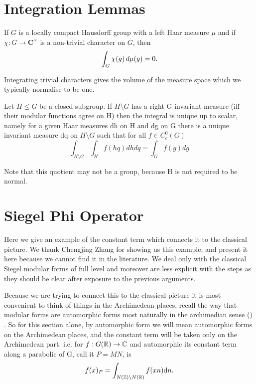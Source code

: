 

\section{Integration Lemmas}
\begin{Theorem}\label{integrate_unitary_char}
	If \(G\) is a locally compact Hausdorff group with a left Haar measure \(\mu\) and if \(\chi\colon G\to \mathbf C^\times\) is a non-trivial character on \(G\), then
	\[ \int^{}_{G}\chi(g)\,d\mu(g) = 0. \]
\end{Theorem}
Integrating trivial characters gives the volume of the measure space which we typically normalise to be one.

\begin{Theorem}
	Let \(H\leq G\) be a closed subgroup. If \(H\setminus G\) has a right G invariant measure (iff their modular functions agree on H) then the integral is unique up to scalar, namely for a given Haar measures dh on H and dg on G there is a unique invariant measure dq on \(H\setminus G\) such that for all \(f\in C_c^0(G)\)
	\[\int_{H\setminus G}\int_H f(hq)dhdq = \int_G f(g) dg\]
\end{Theorem}
Note that this quotient may not be a group, because H is not required to be normal.


\section{Siegel Phi Operator}
Here we give an example of the constant term which connects it to the classical picture. We thank Chengjing Zhang for showing us this example, and present it here because we cannot find it in the literature. We deal only with the classical Siegel modular forms of full level and moreover are less explicit with the steps as they should be clear after exposure to the previous arguments. 

Because we are trying to connect this to the classical picture it is most convenient to think of things in the Archimedean places, recall the way that modular forms are automorphic forms most naturally in the archimedian sense (\cite[6.2]{getzIntroductionAutomorphicRepresentations2024}) \cite{emertonCLASSICALMODULARFORMS}\cite{bumpAutomorphicFormsRepresentations1997}\cite{booherVIEWINGMODULARFORMS}. So for this section alone, by automorphic form we will mean automorphic forms on the Archimedean places, and the constant term will be taken only on the Archimedean part: i.e. for \(f: G(\R) \to \C\) and automorphic its constant term along a parabolic of G, call it \(P=MN\), is \cite[8.6]{getzIntroductionAutomorphicRepresentations2024}
\[f(x)_P = \int_{N(\Z)\backslash N(\R)}f(xn) \mathrm{d}n.\]



